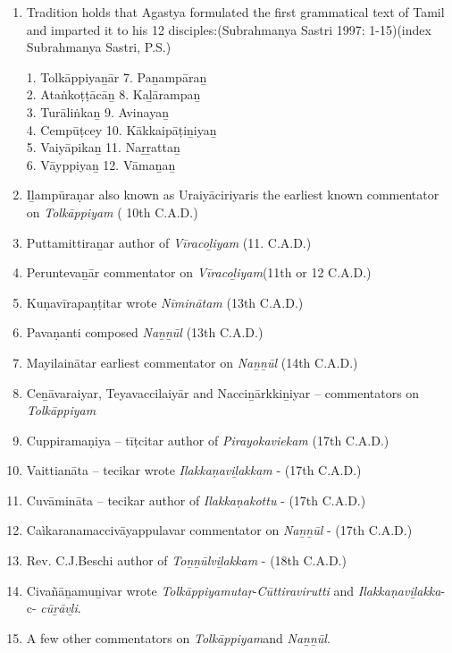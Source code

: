 \begin{enumerate}[{\rm 1)}]
\itemsep=0pt
\item Tradition holds that Agastya formulated the first grammatical text of Tamil and imparted it to his 12 disciples:(Subrahmanya Sastri 1997: 1-15)(index Subrahmanya Sastri, P.S.)

1. Tolkāppiyaṉār
 7. Paṉampāraṉ
 \\2. Ataṅkoṭṭācāṉ
 8. Kaḻārampaṉ
 \\3. Turāliṅkaṉ
 9. Avinayaṉ
 \\4. Cempūṭcey
 10. Kākkaipāṭiṉiyaṉ
 \\5. Vaiyāpikaṉ
 11. Naṟṟattaṉ
 \\6. Vāyppiyaṉ
 12. Vāmaṉaṉ
 \\

 \item Iḻampūraṇar also known as Uraiyāciriyaris the earliest known commentator on \textit{Tolkāppiyam} ( 10th C.A.D.)

 \item Puttamittiraṉar author of \textit{Vīracoḻiyam} (11. C.A.D.)

 \item Peruntevaṉār commentator on \textit{Vīracoḻiyam}(11th or 12 C.A.D.)

 \item Kuṇavīrapaṇṭitar wrote \textit{Nīminātam} (13th C.A.D.)

 \item Pavaṇanti composed \textit{Naṉṉūl} (13th C.A.D.)

 \item Mayilainātar earliest commentator on \textit{Naṉṉūl} (14th C.A.D.)

 \item Ceṉāvaraiyar, Teyavaccilaiyār and Nacciṉārkkiṉiyar – commentators on \textit{Tolkāppiyam}

 \item Cuppiramaṇiya – tīṭcitar author of \textit{Pirayokaviekam} (17th C.A.D.)

 \item Vaittianāta – tecikar wrote \textit{Ilakkaṇaviḻakkam} - (17th C.A.D.)

 \item Cuvāmināta – tecikar author of \textit{Ilakkaṇakottu} - (17th C.A.D.)

 \item Caìkaranamaccivāyappulavar commentator on \textit{Naṉṉūl} - (17th C.A.D.)

 \item Rev. C.J.Beschi author of \textit{Toṉṉūlviḻakkam} - (18th C.A.D.)

 \item Civañāṉamuṉivar wrote \textit{Tolkāppiyamutaṛ}-\textit{Cūttiravirutti} and \textit{Ilakkaṇa\-viḻakka}- c- \textit{cūṟāvḻi}.

 \item A few other commentators on \textit{Tolkāppiyam}and \textit{Naṉṉūl}.

\end{enumerate}


